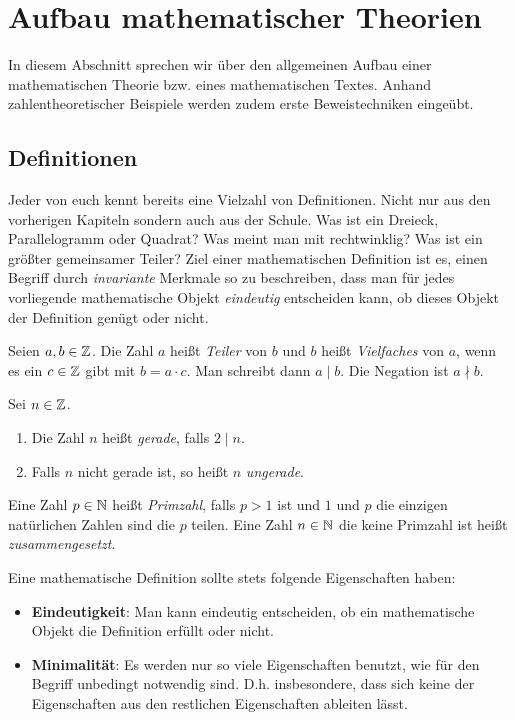 \chapter{Aufbau mathematischer Theorien}

In diesem Abschnitt sprechen wir über den allgemeinen Aufbau einer mathematischen Theorie bzw. eines mathematischen Textes. 
Anhand zahlentheoretischer Beispiele werden zudem erste Beweistechniken eingeübt. 

\section{Definitionen}

Jeder von euch kennt bereits eine Vielzahl von Definitionen. Nicht nur aus den vorherigen Kapiteln sondern auch aus der Schule. 
Was ist ein Dreieck, Parallelogramm oder Quadrat? Was meint man mit rechtwinklig? Was ist ein größter gemeinsamer Teiler?
Ziel einer mathematischen Definition ist es, einen Begriff durch \textit{invariante} Merkmale so zu beschreiben, dass man für jedes 
vorliegende mathematische Objekt \textit{eindeutig} entscheiden kann, ob dieses Objekt der Definition genügt oder nicht. 

\begin{mydef}
    Seien $a,b \in \mathbb{Z}$. Die Zahl $a$ heißt \textit{Teiler} von $b$ und $b$ heißt \textit{Vielfaches} von $a$, wenn es ein $c \in \mathbb{Z}$ gibt mit 
    $b = a \cdot c$. Man schreibt dann $a \mid b$. Die Negation ist $a \nmid b$. 
\end{mydef}

\begin{mydef}
    Sei $n \in \mathbb{Z}$. 
    \begin{enumerate}
        \item 
        Die Zahl $n$ heißt \textit{gerade}, falls $2 \mid n$. 
        \item 
        Falls $n$ nicht gerade ist, so heißt $n$ \textit{ungerade}. 
    \end{enumerate}
\end{mydef}

\begin{mydef}
    Eine Zahl $p \in \mathbb{N}$ heißt \textit{Primzahl}, falls $p > 1$ ist und $1$ und $p$ die einzigen natürlichen Zahlen sind die $p$ teilen. Eine Zahl $n \in \mathbb{N}$ die keine Primzahl ist heißt \textit{zusammengesetzt}. 
\end{mydef}

Eine mathematische Definition sollte stets folgende Eigenschaften haben: 
\begin{itemize}
    \item 
    \textbf{Eindeutigkeit}: Man kann eindeutig entscheiden, ob ein mathematische Objekt die Definition erfüllt oder nicht. 
    \item 
    \textbf{Minimalität}: Es werden nur so viele Eigenschaften benutzt, wie für den Begriff unbedingt notwendig sind. 
    D.h. insbesondere, dass sich keine der Eigenschaften aus den restlichen Eigenschaften ableiten lässt. 
\end{itemize}

